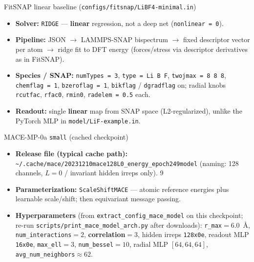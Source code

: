 \documentclass[aspectratio=169]{beamer}
\begin{document}
\begin{frame}{FitSNAP linear baseline (\texttt{configs/fitsnap/LiBF4-minimal.in})}
  \begin{itemize}
    \item \textbf{Solver:} \texttt{RIDGE} --- \textbf{linear} regression, not a deep net (\texttt{nonlinear = 0}).
    \item \textbf{Pipeline:} JSON $\to$ LAMMPS-SNAP bispectrum $\to$ fixed descriptor vector per atom $\to$ ridge fit to DFT energy (forces/stress via descriptor derivatives as in FitSNAP).
    \item \textbf{Species / SNAP:} \texttt{numTypes = 3}, \texttt{type = Li B F}, \texttt{twojmax = 8 8 8}, \texttt{chemflag = 1}, \texttt{bzeroflag = 1}, \texttt{bikflag} / \texttt{dgradflag} on; radial knobs \texttt{rcutfac}, \texttt{rfac0}, \texttt{rmin0}, \texttt{radelem = 0.5} each.
    \item \textbf{Readout:} single \textbf{linear} map from SNAP space (L2-regularized), unlike the PyTorch MLP in \texttt{model/LiF-example.in}.
  \end{itemize}
\end{frame}

\begin{frame}{MACE-MP-0a \texttt{small} (cached checkpoint)}
  \small
  \begin{itemize}
    \item \textbf{Release file (typical cache path):} \texttt{\textasciitilde/.cache/mace/20231210mace128L0\_energy\_epoch249model} (naming: 128 channels, $L{=}0$ / invariant hidden irreps only).
9    \item \textbf{Parameterization:} \texttt{ScaleShiftMACE} --- atomic reference energies plus learnable scale/shift; then equivariant message passing.
    \item \textbf{Hyperparameters} (from \texttt{extract\_config\_mace\_model} on this checkpoint; re-run \texttt{scripts/print\_mace\_model\_arch.py} after downloads):
      \texttt{r\_max}${}=6.0$~\AA, \texttt{num\_interactions}${}=2$, \textbf{correlation}${}=3$, hidden irreps \texttt{128x0e}, readout MLP \texttt{16x0e}, \texttt{max\_ell}${}=3$, \texttt{num\_bessel}${}=10$, radial MLP $[64,64,64]$, \texttt{avg\_num\_neighbors}${}\approx 62$.
  \end{itemize}
\end{frame}
\end{document}
